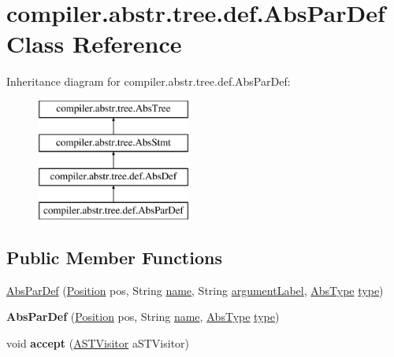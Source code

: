 \hypertarget{classcompiler_1_1abstr_1_1tree_1_1def_1_1_abs_par_def}{}\section{compiler.\+abstr.\+tree.\+def.\+Abs\+Par\+Def Class Reference}
\label{classcompiler_1_1abstr_1_1tree_1_1def_1_1_abs_par_def}
Inheritance diagram for compiler.\+abstr.\+tree.\+def.\+Abs\+Par\+Def\+:\begin{figure}[H]
\begin{center}
\leavevmode
\includegraphics[height=4.000000cm]{classcompiler_1_1abstr_1_1tree_1_1def_1_1_abs_par_def}
\end{center}
\end{figure}
\subsection*{Public Member Functions}
\begin{DoxyCompactItemize}
\item 
\hyperlink{classcompiler_1_1abstr_1_1tree_1_1def_1_1_abs_par_def_a0215d5fd97169f4bcca5800719276bb4}{Abs\+Par\+Def} (\hyperlink{classcompiler_1_1_position}{Position} pos, String \hyperlink{classcompiler_1_1abstr_1_1tree_1_1def_1_1_abs_def_ac6bda9377f5abbb5f1be7d3d1b16481b}{name}, String \hyperlink{classcompiler_1_1abstr_1_1tree_1_1def_1_1_abs_par_def_a252cbe45af15b0cb35db8c44191affa4}{argument\+Label}, \hyperlink{classcompiler_1_1abstr_1_1tree_1_1type_1_1_abs_type}{Abs\+Type} \hyperlink{classcompiler_1_1abstr_1_1tree_1_1def_1_1_abs_par_def_ae777af2ff583e2375f685e818c4495bd}{type})
\item 
\mbox{\label{classcompiler_1_1abstr_1_1tree_1_1def_1_1_abs_par_def_a35c6fe559c36df682957a68ccfadf96f}} 
{\bfseries Abs\+Par\+Def} (\hyperlink{classcompiler_1_1_position}{Position} pos, String \hyperlink{classcompiler_1_1abstr_1_1tree_1_1def_1_1_abs_def_ac6bda9377f5abbb5f1be7d3d1b16481b}{name}, \hyperlink{classcompiler_1_1abstr_1_1tree_1_1type_1_1_abs_type}{Abs\+Type} \hyperlink{classcompiler_1_1abstr_1_1tree_1_1def_1_1_abs_par_def_ae777af2ff583e2375f685e818c4495bd}{type})
\item 
\mbox{\label{classcompiler_1_1abstr_1_1tree_1_1def_1_1_abs_par_def_ad6e7fae3b85fc34ffd730b35723dad35}} 
void {\bfseries accept} (\hyperlink{interfacecompiler_1_1abstr_1_1_a_s_t_visitor}{A\+S\+T\+Visitor} a\+S\+T\+Visitor)
\end{DoxyCompactItemize}
